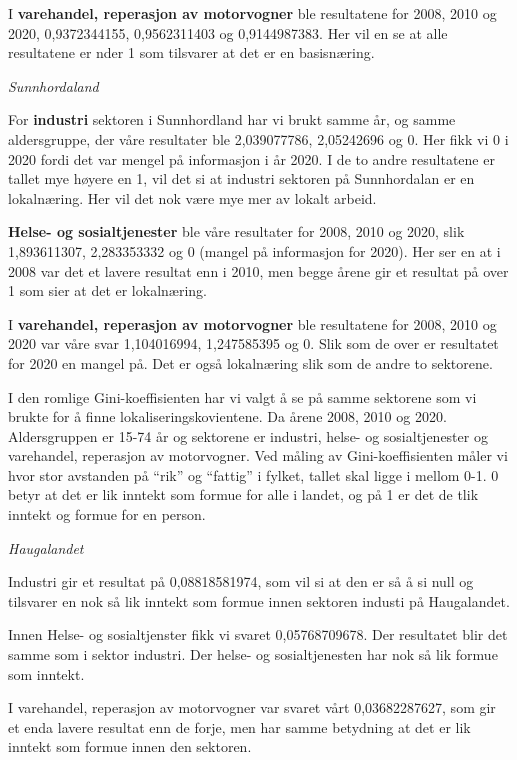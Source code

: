 \documentclass[
]{article}
\begin{document}
I \textbf{varehandel, reperasjon av motorvogner} ble resultatene for
2008, 2010 og 2020, 0,9372344155, 0,9562311403 og 0,9144987383. Her vil
en se at alle resultatene er nder 1 som tilsvarer at det er en
basisnæring.

\emph{Sunnhordaland}

For \textbf{industri} sektoren i Sunnhordland har vi brukt samme år, og
samme aldersgruppe, der våre resultater ble 2,039077786, 2,05242696 og
0. Her fikk vi 0 i 2020 fordi det var mengel på informasjon i år 2020. I
de to andre resultatene er tallet mye høyere en 1, vil det si at
industri sektoren på Sunnhordalan er en lokalnæring. Her vil det nok
være mye mer av lokalt arbeid.

\textbf{Helse- og sosialtjenester} ble våre resultater for 2008, 2010 og
2020, slik 1,893611307, 2,283353332 og 0 (mangel på informasjon for
2020). Her ser en at i 2008 var det et lavere resultat enn i 2010, men
begge årene gir et resultat på over 1 som sier at det er lokalnæring.

I \textbf{varehandel, reperasjon av motorvogner} ble resultatene for
2008, 2010 og 2020 var våre svar 1,104016994, 1,247585395 og 0. Slik som
de over er resultatet for 2020 en mangel på. Det er også lokalnæring
slik som de andre to sektorene.

I den romlige Gini-koeffisienten har vi valgt å se på samme sektorene
som vi brukte for å finne lokaliseringskovientene. Da årene 2008, 2010
og 2020. Aldersgruppen er 15-74 år og sektorene er industri, helse- og
sosialtjenester og varehandel, reperasjon av motorvogner. Ved måling av
Gini-koeffisienten måler vi hvor stor avstanden på ``rik'' og ``fattig''
i fylket, tallet skal ligge i mellom 0-1. 0 betyr at det er lik inntekt
som formue for alle i landet, og på 1 er det de tlik inntekt og formue
for en person.

\emph{Haugalandet}

Industri gir et resultat på 0,08818581974, som vil si at den er så å si
null og tilsvarer en nok så lik inntekt som formue innen sektoren
industi på Haugalandet.

Innen Helse- og sosialtjenster fikk vi svaret 0,05768709678. Der
resultatet blir det samme som i sektor industri. Der helse- og
sosialtjenesten har nok så lik formue som inntekt.

I varehandel, reperasjon av motorvogner var svaret vårt 0,03682287627,
som gir et enda lavere resultat enn de forje, men har samme betydning at
det er lik inntekt som formue innen den sektoren.
\end{document}
